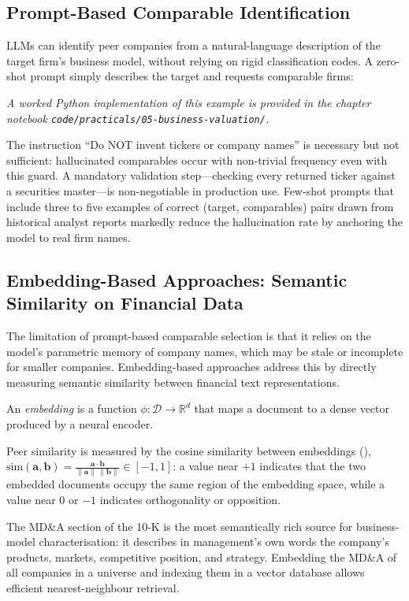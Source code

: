 \begin{deepdive}
\subsection{Prompt-Based Comparable Identification}
\label{subsec:bv-comparables-prompts}

LLMs can identify peer companies from a natural-language description of the target
firm's business model, without relying on rigid classification codes. A zero-shot
prompt simply describes the target and requests comparable firms:

\textit{A worked Python implementation of this example is provided in the chapter notebook \texttt{code/practicals/05-business-valuation/}.}

The instruction ``Do NOT invent tickers or company names'' is necessary but not
sufficient: hallucinated comparables occur with non-trivial frequency even with
this guard. A mandatory validation step---checking every returned ticker against
a securities master---is non-negotiable in production use. Few-shot prompts that
include three to five examples of correct (target, comparables) pairs drawn from
historical analyst reports markedly reduce the hallucination rate by anchoring the
model to real firm names.

\subsection{Embedding-Based Approaches: Semantic Similarity on Financial Data}
\label{subsec:bv-comparables-embeddings}

The limitation of prompt-based comparable selection is that it relies on the model's
parametric memory of company names, which may be stale or incomplete for smaller
companies. Embedding-based approaches address this by directly measuring semantic
similarity between financial text representations.

An \emph{embedding} is a function $\phi: \mathcal{D} \to \mathbb{R}^d$ that maps a document to a dense vector produced by a neural encoder.

Peer similarity is measured by the cosine similarity between embeddings
(), $\mathrm{sim}(\mathbf{a}, \mathbf{b}) = \frac{\mathbf{a} \cdot \mathbf{b}}{\|\mathbf{a}\|\,\|\mathbf{b}\|} \in [-1, 1]$:
a value near $+1$ indicates that the two embedded documents occupy the same region of
the embedding space, while a value near $0$ or $-1$ indicates orthogonality or opposition.

The MD\&A section of the 10-K is the most semantically rich source for business-model
characterisation: it describes in management's own words the company's products,
markets, competitive position, and strategy. Embedding the MD\&A of all companies in
a universe and indexing them in a vector database allows efficient nearest-neighbour
retrieval.


\end{deepdive}
